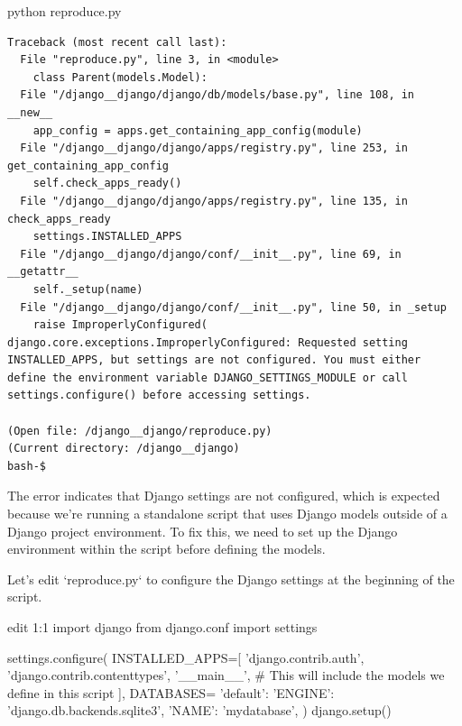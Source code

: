 {\begin{agentbox}
\hrulefill
\begin{CodeVerbatim}[breaklines=true, breakanywhere=true]
python reproduce.py
\end{CodeVerbatim}
\end{agentbox}
\begin{observationbox}\begin{Verbatim}[breaklines=true, breakanywhere=true]
Traceback (most recent call last):
  File "reproduce.py", line 3, in <module>
    class Parent(models.Model):
  File "/django__django/django/db/models/base.py", line 108, in __new__
    app_config = apps.get_containing_app_config(module)
  File "/django__django/django/apps/registry.py", line 253, in get_containing_app_config
    self.check_apps_ready()
  File "/django__django/django/apps/registry.py", line 135, in check_apps_ready
    settings.INSTALLED_APPS
  File "/django__django/django/conf/__init__.py", line 69, in __getattr__
    self._setup(name)
  File "/django__django/django/conf/__init__.py", line 50, in _setup
    raise ImproperlyConfigured(
django.core.exceptions.ImproperlyConfigured: Requested setting INSTALLED_APPS, but settings are not configured. You must either define the environment variable DJANGO_SETTINGS_MODULE or call settings.configure() before accessing settings.

(Open file: /django__django/reproduce.py)
(Current directory: /django__django)
bash-$
\end{Verbatim}
\end{observationbox}
\begin{agentbox}
The error indicates that Django settings are not configured, which is expected because we're running a standalone script that uses Django models outside of a Django project environment. To fix this, we need to set up the Django environment within the script before defining the models.



Let's edit `reproduce.py` to configure the Django settings at the beginning of the script.



\hrulefill
\begin{CodeVerbatim}[breaklines=true, breakanywhere=true]
edit 1:1
import django
from django.conf import settings

settings.configure(
    INSTALLED_APPS=[
        'django.contrib.auth',
        'django.contrib.contenttypes',
        '__main__',  # This will include the models we define in this script
    ],
    DATABASES={
        'default': {
            'ENGINE': 'django.db.backends.sqlite3',
            'NAME': 'mydatabase',
        }
    }
)
django.setup()


\end{CodeVerbatim}
\end{agentbox}}

